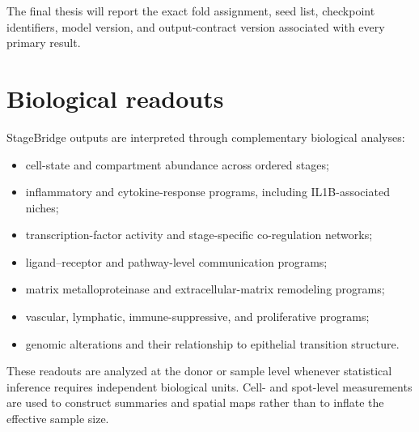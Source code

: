 The final thesis will report the exact fold assignment, seed list, checkpoint identifiers, model version, and output-contract version associated with every primary result.

\section{Biological readouts}

StageBridge outputs are interpreted through complementary biological analyses:

\begin{itemize}
    \item cell-state and compartment abundance across ordered stages;
    \item inflammatory and cytokine-response programs, including IL1B-associated niches;
    \item transcription-factor activity and stage-specific co-regulation networks;
    \item ligand--receptor and pathway-level communication programs;
    \item matrix metalloproteinase and extracellular-matrix remodeling programs;
    \item vascular, lymphatic, immune-suppressive, and proliferative programs;
    \item genomic alterations and their relationship to epithelial transition structure.
\end{itemize}

These readouts are analyzed at the donor or sample level whenever statistical inference requires independent biological units. Cell- and spot-level measurements are used to construct summaries and spatial maps rather than to inflate the effective sample size.

